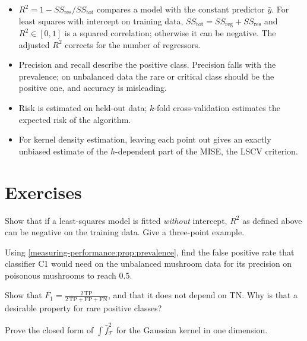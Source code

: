 \begin{notechapter}
\begin{chaptersummary}
\begin{itemize}[nosep]
  \item $R^2 = 1 - SS_{\mathrm{res}}/SS_{\mathrm{tot}}$ compares a model with the
        constant predictor $\bar y$. For least squares with intercept on
        training data, $SS_{\mathrm{tot}} = SS_{\mathrm{reg}} + SS_{\mathrm{res}}$
        and $R^2\in[0,1]$ is a squared correlation; otherwise it can be
        negative. The adjusted $R^2$ corrects for the number of regressors.
  \item Precision and recall describe the positive class. Precision falls with
        the prevalence; on unbalanced data the rare or critical class should be
        the positive one, and accuracy is misleading.
  \item Risk is estimated on held-out data; $k$-fold cross-validation estimates
        the expected risk of the algorithm.
  \item For kernel density estimation, leaving each point out gives an exactly
        unbiased estimate of the $h$-dependent part of the MISE, the LSCV
        criterion.
\end{itemize}
\end{chaptersummary}

\section*{Exercises}

\begin{exercise}\label{measuring-performance:exr:1}
Show that if a least-squares model is fitted \emph{without} intercept, $R^2$ as
defined above can be negative on the training data. Give a three-point example.
\end{exercise}

\begin{exercise}\label{measuring-performance:exr:2}
Using \cref{measuring-performance:prop:prevalence}, find the false positive rate
that classifier C1 would need on the unbalanced mushroom data for its precision
on poisonous mushrooms to reach $0.5$.
\end{exercise}

\begin{exercise}\label{measuring-performance:exr:3}
Show that $F_1 = \frac{2\,\mathrm{TP}}{2\,\mathrm{TP} + \mathrm{FP} + \mathrm{FN}}$,
and that it does not depend on TN. Why is that a desirable property for rare
positive classes?
\end{exercise}

\begin{exercise}\label{measuring-performance:exr:4}
Prove the closed form of $\int\hat f_{\mathcal T}^2$ for the Gaussian kernel in
one dimension.
\end{exercise}
\end{notechapter}
